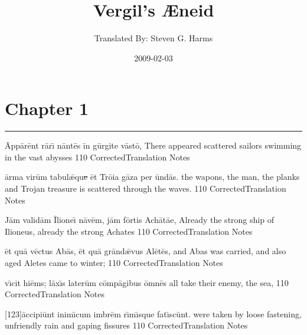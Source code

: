 \documentclass[]{book}
\title{Vergil's {\AE}neid}
\author{ Translated By:  Steven G. Harms }
\date{2009-02-03}
\begin{document}

\ifpdf
{}
\else
{}
\fi

\enumstyle 

\maketitle
\tableofcontents

\chapter{Chapter 1}





\newpage

\rule{7cm}{.5mm}

	\latline
	  {\=App\={\macron a}r\=ent r\={\macron a}r\={\macron \i} n\=ant\={\macron e}s \=in g\=urg\-it\-e v\=ast\={\macron o},}
	  { There appeared scattered sailors swimming in the vast abysses }
	  {110}
	  { CorrectedTranslation }
	  { Notes }



	\latline
	  {\=arm\-a v\-ir\=um t\-ab\-ul\={\ae}qu\sout{e }\=et Tr\={\macron o}\-i\-a g\=az\-a p\-er \=und\={\macron a}s.}
	  { the wapons, the man, the planks and Trojan treasure is scattered through the waves. }
	  {110}
	  { CorrectedTranslation }
	  { Notes }


	\latline
	  {J\=am v\-al\-id\=am \={\macron I}lione\={\macron \i} n\={\macron a}v\=em, j\=am f\=ort\-is \-Ach\={\macron a}t\={ae},}
	  { Already the strong ship of Ilioneus, already the strong Achates }
	  {110}
	  { CorrectedTranslation }
	  { Notes }

\newpage

	\latline
	  {\=et qu\={\macron a} v\=ect\-us \-Ab\={\macron a}s, \=et qu\={\macron a} gr\=and\={\ae}v\-us \-Al\={\macron e}t\={\macron e}s,}
	  { and Abas was carried, and also aged Aletes came to winter;  }
	  {110}
	  { CorrectedTranslation }
	  { Notes }



	\latline
	  {v\={\macron \i}c\-it h\-i\=ems; l\=ax\={\macron \i}s l\-at\-er\=um c\=omp\={\macron a}g\-ib\-us \=omn\={\macron e}s}
	  { all  take their enemy, the sea, }
	  {110}
	  { CorrectedTranslation }
	  { Notes }


	\latline
	  {[123]\=acc\-ip\-i\=unt \-in\-im\={\macron \i}c\-um \-imbr\=em r\={\macron \i}m\={\macron \i}squ\-e f\-at\={\macron \i}sc\=unt.}
	  {  were taken by loose fastening, unfriendly rain and gaping fissures }
	  {110}
	  { CorrectedTranslation }
	  { Notes }
\end{document}
